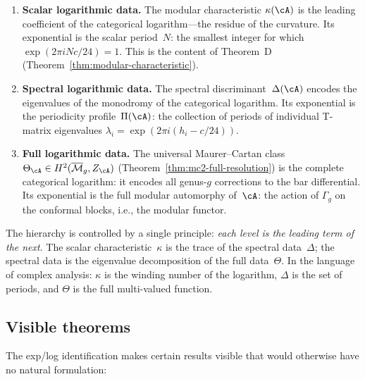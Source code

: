 \begin{enumerate}[label=\textbf{Level \arabic*}:, leftmargin=3.5em]
\item \textbf{Scalar logarithmic data.}  The modular
characteristic $\kappa(\cA)$ is the leading coefficient of the
categorical logarithm---the residue of the curvature.  Its
exponential is the scalar period~$N$: the smallest integer for which
$\exp(2\pi i N c/24) = 1$.  This is the content of Theorem~D
(Theorem~\ref{thm:modular-characteristic}).

\item \textbf{Spectral logarithmic data.}  The spectral
discriminant~$\Delta(\cA)$ encodes the eigenvalues of the monodromy of
the categorical logarithm.  Its exponential is the periodicity
profile~$\Pi(\cA)$: the collection of periods of individual T-matrix
eigenvalues $\lambda_i = \exp(2\pi i(h_i - c/24))$.

\item \textbf{Full logarithmic data.}  The universal Maurer--Cartan
class $\Theta_\cA \in H^2(\overline{\mathcal{M}}_g, Z_\cA)$
(Theorem~\ref{thm:mc2-full-resolution}) is the complete categorical
logarithm: it encodes all genus-$g$ corrections to the bar
differential.  Its exponential is the full modular automorphy of~$\cA$:
the action of $\Gamma_g$ on the conformal blocks, i.e., the modular
functor.
\end{enumerate}

\noindent
The hierarchy is controlled by a single principle: \emph{each level is
the leading term of the next}.  The scalar characteristic~$\kappa$ is
the trace of the spectral data~$\Delta$; the spectral data is the
eigenvalue decomposition of the full data~$\Theta$.  In the language of
complex analysis: $\kappa$ is the winding number of the logarithm,
$\Delta$ is the set of periods, and $\Theta$ is the full multi-valued
function.

\subsection{Visible theorems}
\label{subsec:visible-theorems-log}

The exp/log identification makes certain results visible that would
otherwise have no natural formulation:

